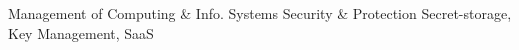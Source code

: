 \documentclass[10pt]{socc}
\begin{document}
         {Management of Computing \& Info. Systems}
         {Security \& Protection}
\keywords
Secret-storage, Key Management, SaaS








{
  \clearpage
  
  
}
\end{document}
